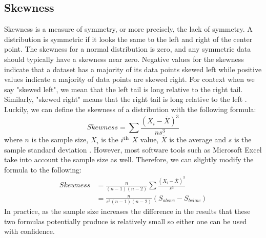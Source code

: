 \subsection{Skewness}

Skewness is a measure of symmetry, or more precisely, the lack of symmetry. A 
distribution is symmetric if it looks the same to the left and right of the center 
point. The skewness for a normal distribution is zero, and any symmetric data 
should typically have a skewness near zero. Negative values for the skewness 
indicate that a dataset has a majority of its data points skewed left while positive 
values indicate a majority of data points are skewed right. For context when we
say "skewed left", we mean that the left tail is long relative to the right tail. 
Similarly, "skewed right" means that the right tail is long relative to the 
left \cite{c13}. Luckily, we can define the skewness of a distribution with the 
following formula:
\begin{equation}
    Skewness = \sum{}{} \frac{(X_i-\bar{X})^3}{ns^3}
\end{equation}
where $n$ is the sample size, $X_i$ is the $i\textsuperscript{th}$ $X$ value, $\bar{X}$ 
is the average and $s$ is the sample standard deviation \cite{c14}. However, most software 
tools such as Microsoft Excel take into account the sample size as well. Therefore,
we can slightly modify the formula to the following:
\begin{equation}
    \begin{split}
        Skewness & = \frac{n}{(n-1)(n-2)}\sum{}{} \frac{(X_i-\bar{X})^3}{s^3} \\
        & = \frac{n}{s^3(n-1)(n-2)}(S_{above} - S_{below})
    \end{split}
\end{equation}
In practice, as the sample size increases the difference in the results that these 
two formulas potentially produce is relatively small so either one can be used with 
confidence. 

